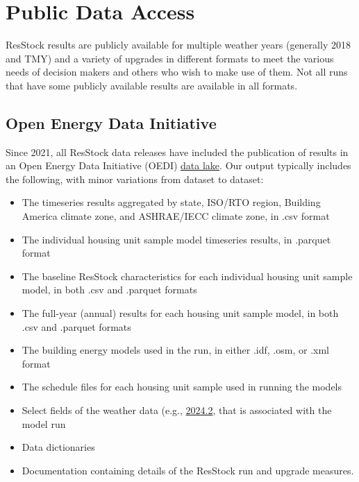 \chapter{Public Data Access}

ResStock results are publicly available for multiple weather years (generally 2018 and TMY) and a variety of upgrades in different formats to meet the various needs of decision makers and others who wish to make use of them. Not all runs that have some publicly available results are available in all formats.

\section{Open Energy Data Initiative}  
Since 2021, all ResStock data releases have included the publication of results in an Open Energy Data Initiative (OEDI) \href{https://data.openei.org/s3_viewer?bucket=oedi-data-lake&prefix=nrel-pds-building-stock%2Fend-use-load-profiles-for-us-building-stock}{data lake}. Our output typically includes the following, with minor variations from dataset to dataset:
\begin{itemize}
    \item The timeseries results aggregated by state, ISO/RTO region, Building America climate zone, and ASHRAE/IECC climate zone, in .csv format
    \item The individual housing unit sample model timeseries results, in .parquet format
    \item The baseline ResStock characteristics for each individual housing unit sample model, in both .csv and .parquet formats
    \item The full-year (annual) results for each housing unit sample model, in both .csv and .parquet formats
    \item The building energy models used in the run, in either .idf, .osm, or .xml format
    \item The schedule files for each housing unit sample used in running the models
    \item Select fields of the weather data (e.g., \href{https://data.openei.org/s3_viewer?bucket=oedi-data-lake&prefix=nrel-pds-building-stock%2Fend-use-load-profiles-for-us-building-stock%2F2024%2Fresstock_tmy3_release_2%2Fweather%2F}{2024.2}, that is associated with the model run
    \item Data dictionaries
    \item Documentation containing details of the ResStock run and upgrade measures.
\end{itemize}
